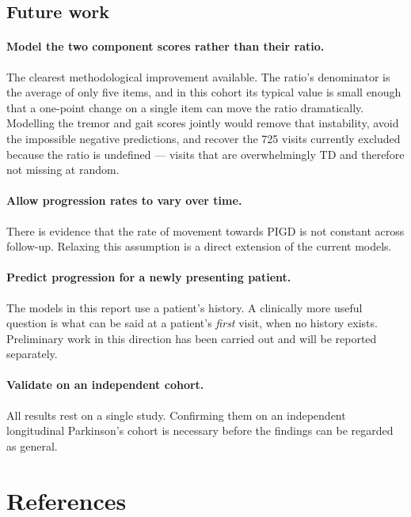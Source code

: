 \documentclass[11pt,a4paper]{article}
\begin{document}
\subsection{Future work}

\paragraph{Model the two component scores rather than their ratio.}
The clearest methodological improvement available. The ratio's denominator is
the average of only five items, and in this cohort its typical value is small
enough that a one-point change on a single item can move the ratio dramatically.
Modelling the tremor and gait scores jointly would remove that instability,
avoid the impossible negative predictions, and recover the 725 visits currently
excluded because the ratio is undefined --- visits that are overwhelmingly TD
and therefore not missing at random.

\paragraph{Allow progression rates to vary over time.}
There is evidence that the rate of movement towards PIGD is not constant across
follow-up. Relaxing this assumption is a direct extension of the current models.

\paragraph{Predict progression for a newly presenting patient.}
The models in this report use a patient's history. A clinically more useful
question is what can be said at a patient's \emph{first} visit, when no history
exists. Preliminary work in this direction has been carried out and will be
reported separately.

\paragraph{Validate on an independent cohort.}
All results rest on a single study. Confirming them on an independent
longitudinal Parkinson's cohort is necessary before the findings can be regarded
as general.

\section*{References}
\end{document}
